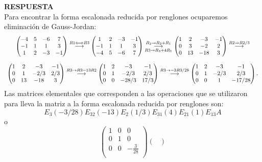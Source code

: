 \documentclass[11pt,letterpaper]{article}
\newcommand{\res}{\textbf{RESPUESTA}\\}
\newcommand{\grstep}[2][\relax]{%
   \ensuremath{\mathrel{
       {\mathop{\longrightarrow}\limits^{#2\mathstrut}_{
                                     \begin{subarray}{l} #1 \end{subarray}}}}}}
\begin{document}
\begin{enumerate}
\res
Para encontrar la forma escalonada reducida por renglones ocuparemos eliminación de Gauss-Jordan:
\begin{equation*}
\begin{array}{c}
\begin{pmatrix}
-4 & 5 & -6 &7\\
-1 & 1 &  1 &3\\
1  & 2 & -3 &-1
\end{pmatrix}
%
\grstep[]{R1 \Longleftrightarrow R3}
\begin{pmatrix}
1  & 2 & -3 &-1\\
-1 & 1 &  1 &3\\
-4 & 5 & -6 &7
\end{pmatrix}%
\grstep[R3 \rightarrow R_3 +4R_1]{R_2 \rightarrow R_2 +R_1}
%
\begin{pmatrix}
1  & 2 & -3 &-1\\
0 & 3  & -2 & 2\\
0 & 13 & -18 &3
\end{pmatrix}%
\grstep[]{R2 \rightarrow R2/3}
\\
\\
\begin{pmatrix}
1  & 2 & -3 &-1\\
0 &  1 & -2/3 & 2/3\\
0 & 13 & -18 &3
\end{pmatrix}%
\grstep[]{R3 \rightarrow R3-13R2}
%
\begin{pmatrix}
1  & 2 & -3 &-1\\
0 &  1 & -2/3 & 2/3\\
0 &  0 & -28/3 & 17/3
\end{pmatrix}%
\grstep[]{R3 \rightarrow -3R3/28}
%
\begin{pmatrix}
1  & 2 & -3 &-1\\
0 &  1 & -2/3 & 2/3\\
0 &  0 & 1 & -17/28
\end{pmatrix}.
\end{array}
\end{equation*}
Las matrices elementales que corresponden a las operaciones que se utilizaron para lleva la matriz a la forma escalonada reducida por renglones son:
$$E_3(-3/28)E_{32}(-13)E_2(1/3)E_{31}(4)E_{21}(1)E_{13}A$$
o
$$\begin{pmatrix}
1 & 0 & 0\\
0 & 1 & 0\\
0 & 0 & -\frac{3}{28}\\
\end{pmatrix} \begin{pmatrix}

\end{pmatrix}$$
\end{enumerate}
\end{document}
